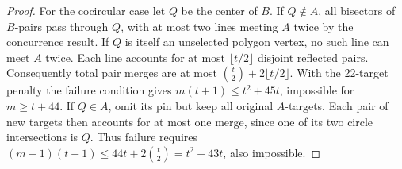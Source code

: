 \begin{proof}
For the cocircular case let \(Q\) be the center of \(B\). If \(Q\notin A\),
all bisectors of \(B\)-pairs pass through \(Q\), with at most two lines
meeting \(A\) twice by the concurrence result. If \(Q\) is itself an
unselected polygon vertex, no such line can meet \(A\) twice. Each line
accounts for at most \(\lfloor t/2\rfloor\) disjoint reflected pairs.
Consequently total pair merges are at most \(\binom t2+2\lfloor t/2\rfloor\).
With the 22-target penalty the failure condition gives
\(m(t+1)\le t^2+45t\), impossible for \(m\ge t+44\).
If \(Q\in A\), omit its pin but keep all original \(A\)-targets.
Each pair of new targets then accounts for at most one merge, since
one of its two circle intersections is \(Q\). Thus failure requires
\((m-1)(t+1)\le44t+2\binom t2=t^2+43t\), also impossible.
\end{proof}

